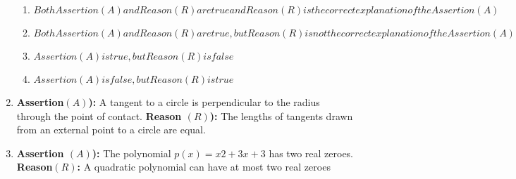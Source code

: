 \documentclass[12pt-letter paper]{article}
\providecommand{\brak}[1]{\ensuremath{\left(#1\right)}}
\begin{document}
\begin{enumerate}
\begin{enumerate}
\item $ Both Assertion \brak{A} and Reason \brak{R} are true and Reason \brak{R} is the correct explanation of the Assertion \brak{A} $                          
\item $ Both Assertion \brak{A} and Reason \brak{R} are true,but Reason \brak{R} is not the correct explanation of the Assertion \brak{A} $  
\item $ Assertion \brak{A} is true, but Reason \brak{R}is false $  
\item $ Assertion\brak{A} is false, but Reason \brak{R} is true $
\end{enumerate}
\item \textbf{Assertion\brak{A}):} A tangent to a circle is perpendicular to the radius through the point of contact.
\textbf{Reason \brak{R}):} The lengths of tangents drawn from an external point to a circle are equal.                                                                       \item \textbf{Assertion \brak{A}):} The polynomial $p(x) = x2 + 3x + 3$ has two real zeroes.    
\textbf{Reason\brak{R}:} A quadratic polynomial can have at most two real zeroes    
\end{enumerate}      
\end{document}
